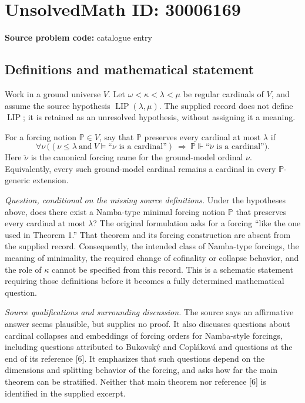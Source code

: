 \documentclass[11pt]{article}
\begin{document}
\section*{UnsolvedMath ID: 30006169}
\textbf{Source problem code:} catalogue entry
\subsection{Definitions and mathematical statement}
Work in a ground universe \(V\). Let \(\omega<\kappa<\lambda<\mu\) be regular cardinals of \(V\), and assume the source hypothesis \(\operatorname{LIP}(\lambda,\mu)\). The supplied record does not define \(\operatorname{LIP}\); it is retained as an unresolved hypothesis, without assigning it a meaning.

For a forcing notion \(\mathbb P\in V\), say that \(\mathbb P\) preserves every cardinal at most \(\lambda\) if
\[
\forall\nu\,\bigl((\nu\leq\lambda\ \text{and}\ V\models\text{``}\nu\text{ is a cardinal''})\ \Longrightarrow\ \mathbb P\Vdash\text{``}\check\nu\text{ is a cardinal''}\bigr).
\]
Here \(\check\nu\) is the canonical forcing name for the ground-model ordinal \(\nu\). Equivalently, every such ground-model cardinal remains a cardinal in every \(\mathbb P\)-generic extension.

\emph{Question, conditional on the missing source definitions.} Under the hypotheses above, does there exist a Namba-type minimal forcing notion \(\mathbb P\) that preserves every cardinal at most \(\lambda\)? The original formulation asks for a forcing ``like the one used in Theorem 1.'' That theorem and its forcing construction are absent from the supplied record. Consequently, the intended class of Namba-type forcings, the meaning of minimality, the required change of cofinality or collapse behavior, and the role of \(\kappa\) cannot be specified from this record. This is a schematic statement requiring those definitions before it becomes a fully determined mathematical question.

\emph{Source qualifications and surrounding discussion.} The source says an affirmative answer seems plausible, but supplies no proof. It also discusses questions about cardinal collapses and embeddings of forcing orders for Namba-style forcings, including questions attributed to Bukovsk\'y and Copl\'akov\'a and questions at the end of its reference [6]. It emphasizes that such questions depend on the dimensions and splitting behavior of the forcing, and asks how far the main theorem can be stratified. Neither that main theorem nor reference [6] is identified in the supplied excerpt.
\end{document}
